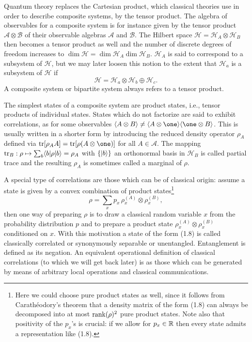 \documentclass[11pt,a4paper]{article}
\theoremstyle{plain}
\theoremstyle{definition}
\theoremstyle{remark}
\numberwithin{equation}{section}
\begin{document}
Quantum theory replaces the Cartesian product, which classical theories use in order to describe composite systems, by the tensor product. The algebra of observables for a composite system is for instance given by the tensor product $\mathcal{A}\otimes \mathcal{B}$ of their observable algebras $\mathcal{A}$ and $\mathcal{B}$. The Hilbert space $\mathcal{H}=\mathcal{H}_A\otimes \mathcal{H}_B$ then becomes a tensor product as well and the number of discrete degrees of freedom increases to $\dim \mathcal{H}=\dim\mathcal{H}_A\dim\mathcal{H}_B$. $\mathcal{H}_A$ is said to correspond to a subsystem of $\mathcal{H}$, but we may later loosen this notion to the extent that $\mathcal{H}_a$ is a subsystem of $\mathcal{H}$ if
\begin{equation}
    \mathcal{H}=\mathcal{H}_a\otimes \mathcal{H}_b \oplus \mathcal{H}_c.
\end{equation}
A composite system or bipartite system always refers to a tensor product.

The simplest states of a composite system are product states, i.e., tensor products of individual states. States which do not factorize are said to exhibit correlations, as for some observables $\langle A\otimes B\rangle\ne \langle A\otimes \one\rangle\langle \one\otimes B\rangle$. This is usually written in a shorter form by introducing the reduced density operator $\rho_A$ defined via $\tr[\rho_A A]=\tr[\rho(A\otimes \one)]$ for all $A\in \mathcal{A}$. The mapping $\operatorname{tr}_B:\rho\mapsto \sum_b \langle b|\rho|b\rangle=\rho_A$ with $\{|b\rangle\}$ an orthonormal basis in $\mathcal{H}_B$ is called partial trace and the resulting $\rho_A$ is sometimes called a marginal of $\rho$.

A special type of correlations are those which can be of classical origin: assume a state is given by a convex combination of product states\footnote{Here we could choose pure product states as well, since it follows from Carath\'eodory's theorem that a density matrix of the form (1.8) can always be decomposed into at most $\operatorname{rank}(\rho)^2$ pure product states. Note also that positivity of the $p_x$'s is crucial: if we allow for $p_x\in \mathbb{R}$ then every state admits a representation like (1.8).}
\begin{equation}
    \rho = \sum_x p_x\, \rho_x^{(A)} \otimes \rho_x^{(B)} ,
\end{equation}
then one way of preparing $\rho$ is to draw a classical random variable $x$ from the probability distribution $p$ and to prepare a product state $\rho_x^{(A)}\otimes\rho_x^{(B)}$ conditioned on $x$. With this motivation a state of the form (1.8) is called classically correlated or synonymously separable or unentangled. Entanglement is defined as its negation. An equivalent operational definition of classical correlations (to which we will get back later) is as those which can be generated by means of arbitrary local operations and classical communications.
\end{document}

